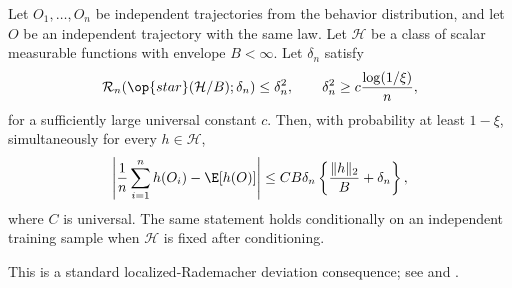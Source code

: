 \documentclass[opre,nonblindrev]{informs4}
\newcommand{\norm}[1]{\lVert#1\rVert}
\providecommand{\mathscr}{\mathcal}
\begin{document}
\begin{lemma}
\label{lemma-lemma14-foster2019}
Let $O_1,\ldots,O_n$ be independent trajectories from the behavior
distribution, and let $O$ be an independent trajectory with the same law.
Let $\mathcal H$ be a class of scalar measurable functions with envelope
$B<\infty$. Let $\delta_n$ satisfy
\[
\mathscr R_n\!\left(\op{star}(\mathcal H/B);\delta_n\right)\leq\delta_n^2,
\qquad \delta_n^2\geq c\frac{\log(1/\xi)}{n},
\]
for a sufficiently large universal constant $c$. Then, with probability at
least $1-\xi$, simultaneously for every $h\in\mathcal H$,
\begin{equation*}
\left|\frac1n\sum_{i=1}^n h(O_i)-\E[h(O)]\right|
\leq
CB\delta_n
\left\{
\frac{\norm{h}_2}{B}+\delta_n
\right\},
\end{equation*}
where $C$ is universal. The same statement holds conditionally on an
independent training sample when $\mathcal H$ is fixed after conditioning.
\end{lemma}
This is a standard localized-Rademacher deviation consequence; see
\citet[Lemma~14]{foster2019orthogonal} and \citet{wainwright2019high}.
\end{document}
